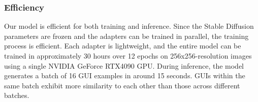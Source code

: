 \subsubsection{Efficiency}

Our model is efficient for both training and inference. Since the Stable Diffusion parameters are frozen and the adapters can be trained in parallel, the training process is efficient. Each adapter is lightweight, and the entire model can be trained in approximately 30 hours over 12 epochs on 256x256-resolution images using a single NVIDIA GeForce RTX4090 GPU. During inference, the model generates a batch of 16 GUI examples in around 15 seconds. GUIs within the same batch exhibit more similarity to each other than those across different batches.




  

